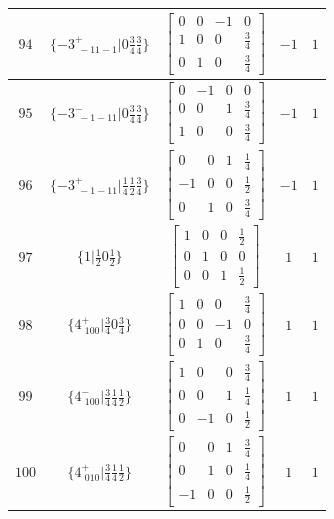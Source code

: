 \documentclass[fleqn,8pt]{jsarticle}
\begin{document}
\begin{longtable}{ccccc}
$ 94 $ & $ \{-3^{+}_{\,\,-11-1}|0 \frac{3}{4} \frac{3}{4}\} $ & $ \begin{bmatrix} 0 & 0 & -1 & 0 \\ 1 & 0 & 0 & \frac{3}{4} \\ 0 & 1 & 0 & \frac{3}{4} \end{bmatrix} $ & $ -1 $ & $ 1 $ \\ \hline
$ 95 $ & $ \{-3^{-}_{\,\,-1-11}|0 \frac{3}{4} \frac{3}{4}\} $ & $ \begin{bmatrix} 0 & -1 & 0 & 0 \\ 0 & 0 & 1 & \frac{3}{4} \\ 1 & 0 & 0 & \frac{3}{4} \end{bmatrix} $ & $ -1 $ & $ 1 $ \\ \hline
$ 96 $ & $ \{-3^{+}_{\,\,-1-11}|\frac{1}{4} \frac{1}{2} \frac{3}{4}\} $ & $ \begin{bmatrix} 0 & 0 & 1 & \frac{1}{4} \\ -1 & 0 & 0 & \frac{1}{2} \\ 0 & 1 & 0 & \frac{3}{4} \end{bmatrix} $ & $ -1 $ & $ 1 $ \\ \hline
$ 97 $ & $ \{1|\frac{1}{2} 0 \frac{1}{2}\} $ & $ \begin{bmatrix} 1 & 0 & 0 & \frac{1}{2} \\ 0 & 1 & 0 & 0 \\ 0 & 0 & 1 & \frac{1}{2} \end{bmatrix} $ & $ 1 $ & $ 1 $ \\ \hline
$ 98 $ & $ \{4^{+}_{\,\,100}|\frac{3}{4} 0 \frac{3}{4}\} $ & $ \begin{bmatrix} 1 & 0 & 0 & \frac{3}{4} \\ 0 & 0 & -1 & 0 \\ 0 & 1 & 0 & \frac{3}{4} \end{bmatrix} $ & $ 1 $ & $ 1 $ \\ \hline
$ 99 $ & $ \{4^{-}_{\,\,100}|\frac{3}{4} \frac{1}{4} \frac{1}{2}\} $ & $ \begin{bmatrix} 1 & 0 & 0 & \frac{3}{4} \\ 0 & 0 & 1 & \frac{1}{4} \\ 0 & -1 & 0 & \frac{1}{2} \end{bmatrix} $ & $ 1 $ & $ 1 $ \\ \hline
$ 100 $ & $ \{4^{+}_{\,\,010}|\frac{3}{4} \frac{1}{4} \frac{1}{2}\} $ & $ \begin{bmatrix} 0 & 0 & 1 & \frac{3}{4} \\ 0 & 1 & 0 & \frac{1}{4} \\ -1 & 0 & 0 & \frac{1}{2} \end{bmatrix} $ & $ 1 $ & $ 1 $ \\ \hline

\end{longtable}
\end{document}
